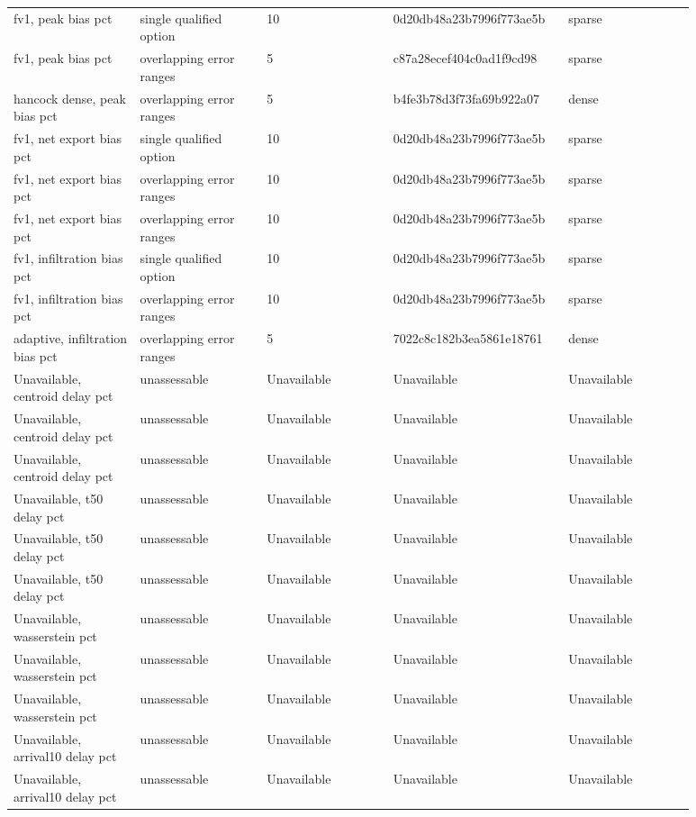 \begin{longtable}{p{0.1760\linewidth}p{0.1760\linewidth}p{0.1760\linewidth}p{0.1760\linewidth}p{0.1760\linewidth}}
fv1, peak bias pct & single qualified option & 10 & 0d20db48a23b7996f773ae5b & sparse \\
fv1, peak bias pct & overlapping error ranges & 5 & c87a28ecef404c0ad1f9cd98 & sparse \\
hancock dense, peak bias pct & overlapping error ranges & 5 & b4fe3b78d3f73fa69b922a07 & dense \\
fv1, net export bias pct & single qualified option & 10 & 0d20db48a23b7996f773ae5b & sparse \\
fv1, net export bias pct & overlapping error ranges & 10 & 0d20db48a23b7996f773ae5b & sparse \\
fv1, net export bias pct & overlapping error ranges & 10 & 0d20db48a23b7996f773ae5b & sparse \\
fv1, infiltration bias pct & single qualified option & 10 & 0d20db48a23b7996f773ae5b & sparse \\
fv1, infiltration bias pct & overlapping error ranges & 10 & 0d20db48a23b7996f773ae5b & sparse \\
adaptive, infiltration bias pct & overlapping error ranges & 5 & 7022c8c182b3ea5861e18761 & dense \\
Unavailable, centroid delay pct & unassessable & Unavailable & Unavailable & Unavailable \\
Unavailable, centroid delay pct & unassessable & Unavailable & Unavailable & Unavailable \\
Unavailable, centroid delay pct & unassessable & Unavailable & Unavailable & Unavailable \\
Unavailable, t50 delay pct & unassessable & Unavailable & Unavailable & Unavailable \\
Unavailable, t50 delay pct & unassessable & Unavailable & Unavailable & Unavailable \\
Unavailable, t50 delay pct & unassessable & Unavailable & Unavailable & Unavailable \\
Unavailable, wasserstein pct & unassessable & Unavailable & Unavailable & Unavailable \\
Unavailable, wasserstein pct & unassessable & Unavailable & Unavailable & Unavailable \\
Unavailable, wasserstein pct & unassessable & Unavailable & Unavailable & Unavailable \\
Unavailable, arrival10 delay pct & unassessable & Unavailable & Unavailable & Unavailable \\
Unavailable, arrival10 delay pct & unassessable & Unavailable & Unavailable & Unavailable \\

\end{longtable}
